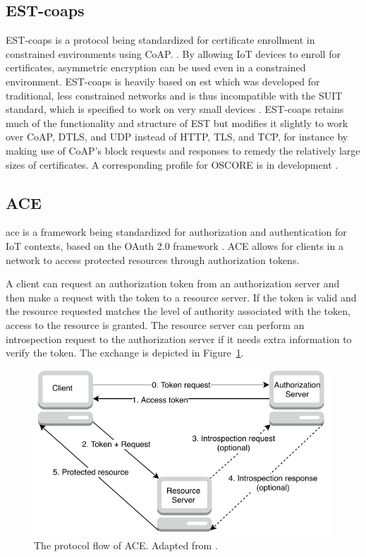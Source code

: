 \documentclass[0-thesis.tex]{subfiles}
\begin{document}
\subsection{EST-coaps}
\label{ssec:est-coaps}
EST-coaps is a protocol being standardized for certificate enrollment in constrained
environments using CoAP. \parencite{est-coaps}. By allowing IoT devices to enroll for
certificates, asymmetric encryption can be used even in a constrained environment.
EST-coaps is heavily based on \gls{est} which was developed for traditional, less
constrained networks and is thus incompatible with the SUIT standard, which is specified
to work on very small devices \parencite{rfc7030}. EST-coaps retains much of the
functionality and structure of EST but modifies it slightly to work over CoAP, DTLS, and
UDP instead of HTTP, TLS, and TCP, for instance by making use of CoAP's block requests and
responses to remedy the relatively large sizes of certificates. A corresponding profile
for OSCORE is in development \parencite{est-oscore}.

\subsection{ACE}
\label{ssec:ace}
\gls{ace} is a framework being standardized for authorization and authentication for IoT
contexts, based on the OAuth 2.0 framework \parencite{ace}. ACE allows for clients in a
network to access protected resources through authorization tokens. 

A client can request an authorization token from an authorization server and then make a
request with the token to a resource server. If the token is valid and the resource
requested matches the level of authority associated with the token, access to the resource
is granted. The resource server can perform an introspection request to the authorization
server if it needs extra information to verify the token. The exchange is depicted in
Figure~\ref{fig:ace-flow}.

\begin{figure}
    \caption{The protocol flow of ACE. Adapted from \parencite{ace}.}
    \label{fig:ace-flow}
    \includegraphics{images/ace.pdf}
\end{figure}
\end{document}
